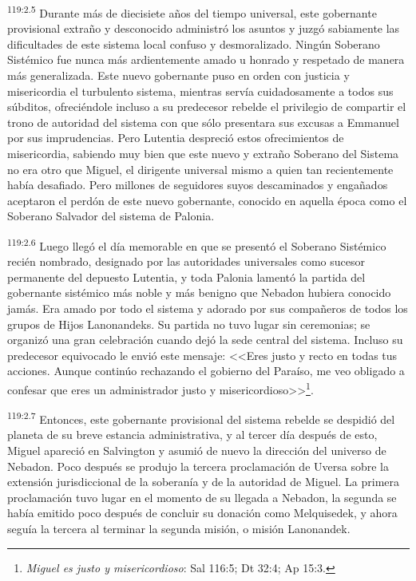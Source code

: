 \par
\textsuperscript{119:2.5} Durante más de diecisiete años del tiempo universal, este gobernante provisional extraño y desconocido administró los asuntos y juzgó sabiamente las dificultades de este sistema local confuso y desmoralizado. Ningún Soberano Sistémico fue nunca más ardientemente amado u honrado y respetado de manera más generalizada. Este nuevo gobernante puso en orden con justicia y misericordia el turbulento sistema, mientras servía cuidadosamente a todos sus súbditos, ofreciéndole incluso a su predecesor rebelde el privilegio de compartir el trono de autoridad del sistema con que sólo presentara sus excusas a Emmanuel por sus imprudencias. Pero Lutentia despreció estos ofrecimientos de misericordia, sabiendo muy bien que este nuevo y extraño Soberano del Sistema no era otro que Miguel, el dirigente universal mismo a quien tan recientemente había desafiado. Pero millones de seguidores suyos descaminados y engañados aceptaron el perdón de este nuevo gobernante, conocido en aquella época como el Soberano Salvador del sistema de Palonia.

\par
\textsuperscript{119:2.6} Luego llegó el día memorable en que se presentó el Soberano Sistémico recién nombrado, designado por las autoridades universales como sucesor permanente del depuesto Lutentia, y toda Palonia lamentó la partida del gobernante sistémico más noble y más benigno que Nebadon hubiera conocido jamás. Era amado por todo el sistema y adorado por sus compañeros de todos los grupos de Hijos Lanonandeks. Su partida no tuvo lugar sin ceremonias; se organizó una gran celebración cuando dejó la sede central del sistema. Incluso su predecesor equivocado le envió este mensaje: <<Eres justo y recto en todas tus acciones. Aunque continúo rechazando el gobierno del Paraíso, me veo obligado a confesar que eres un administrador justo y misericordioso>>\footnote{\textit{Miguel es justo y misericordioso}: Sal 116:5; Dt 32:4; Ap 15:3.}.

\par
\textsuperscript{119:2.7} Entonces, este gobernante provisional del sistema rebelde se despidió del planeta de su breve estancia administrativa, y al tercer día después de esto, Miguel apareció en Salvington y asumió de nuevo la dirección del universo de Nebadon. Poco después se produjo la tercera proclamación de Uversa sobre la extensión jurisdiccional de la soberanía y de la autoridad de Miguel. La primera proclamación tuvo lugar en el momento de su llegada a Nebadon, la segunda se había emitido poco después de concluir su donación como Melquisedek, y ahora seguía la tercera al terminar la segunda misión, o misión Lanonandek.

